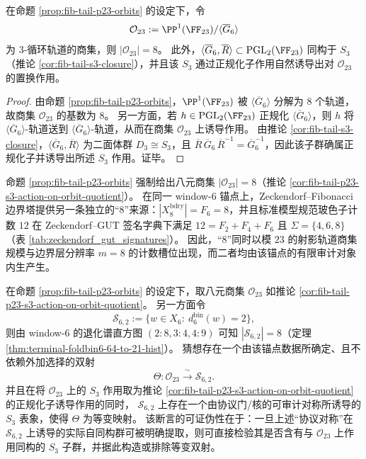 \begin{corollary}\label{cor:fib-tail-p23-s3-action-on-orbit-quotient}
在命题 \ref{prop:fib-tail-p23-orbits} 的设定下，令
\[
\mathcal O_{23}:=\PP^1(\FF_{23})/\langle \overline{G}_6\rangle
\]
为 \(3\)-循环轨道的商集，则 \(|\mathcal O_{23}|=8\)。
此外，\(\langle \overline{G}_6,\overline{R}\rangle\subset \mathrm{PGL}_2(\FF_{23})\) 同构于 \(S_3\)（推论 \ref{cor:fib-tail-s3-closure}），并且该 \(S_3\) 通过正规化子作用自然诱导出对 \(\mathcal O_{23}\) 的置换作用。
\end{corollary}
\begin{proof}
由命题 \ref{prop:fib-tail-p23-orbits}，\(\PP^1(\FF_{23})\) 被 \(\langle \overline{G}_6\rangle\) 分解为 \(8\) 个轨道，故商集 \(\mathcal O_{23}\) 的基数为 \(8\)。
另一方面，若 \(h\in \mathrm{PGL}_2(\FF_{23})\) 正规化 \(\langle \overline{G}_6\rangle\)，则 \(h\) 将 \(\langle \overline{G}_6\rangle\)-轨道送到 \(\langle \overline{G}_6\rangle\)-轨道，从而在商集 \(\mathcal O_{23}\) 上诱导作用。
由推论 \ref{cor:fib-tail-s3-closure}，\(\langle \overline{G}_6,\overline{R}\rangle\) 为二面体群 \(D_3\cong S_3\)，且 \(\overline{R}\,\overline{G}_6\,\overline{R}^{-1}=\overline{G}_6^{-1}\)，因此该子群确属正规化子并诱导出所述 \(S_3\) 作用。证毕。
\end{proof}

\begin{remark}\label{rem:fib-tail-p23-eightfold-alignment}
命题 \ref{prop:fib-tail-p23-orbits} 强制给出八元商集 \(|\mathcal O_{23}|=8\)（推论 \ref{cor:fib-tail-p23-s3-action-on-orbit-quotient}）。
在同一 window-\(6\) 锚点上，Zeckendorf--Fibonacci 边界塔提供另一条独立的“\(8\)”来源：\(|X^{\mathrm{bdry}}_8|=F_6=8\)，并且标准模型规范玻色子计数 \(12\) 在 Zeckendorf--GUT 签名字典下满足 \(12=F_2+F_4+F_6\) 且 \(\Sigma=\{4,6,8\}\)（表 \ref{tab:zeckendorf_gut_signatures}）。
因此，“\(8\)”同时以模 \(23\) 的射影轨道商集规模与边界层分辨率 \(m=8\) 的计数槽位出现，而二者均由该锚点的有限审计对象内生产生。
\end{remark}

\begin{conjecture}[八元商集与二层纤维八重态的可审计对应]\label{conj:window6-eightfold-orbit-fiber-bijection}
在命题 \ref{prop:fib-tail-p23-orbits} 的设定下，取八元商集 \(\mathcal O_{23}\) 如推论 \ref{cor:fib-tail-p23-s3-action-on-orbit-quotient}。
另一方面令
\[
\mathcal S_{6,2}:=\{w\in X_6:\ d^{\mathrm{bin}}_6(w)=2\},
\]
则由 window-\(6\) 的退化谱直方图 \((2{:}8,3{:}4,4{:}9)\) 可知 \(|\mathcal S_{6,2}|=8\)（定理 \ref{thm:terminal-foldbin6-64-to-21-hist}）。
猜想存在一个由该锚点数据所确定、且不依赖外加选择的双射
\[
\Theta:\mathcal O_{23}\xrightarrow{\ \sim\ }\mathcal S_{6,2}.
\]
并且在将 \(\mathcal O_{23}\) 上的 \(S_3\) 作用取为推论 \ref{cor:fib-tail-p23-s3-action-on-orbit-quotient} 的正规化子诱导作用的同时，
\(\mathcal S_{6,2}\) 上存在一个由协议门/核的可审计对称所诱导的 \(S_3\) 表象，使得 \(\Theta\) 为等变映射。
该断言的可证伪性在于：一旦上述“协议对称”在 \(\mathcal S_{6,2}\) 上诱导的实际自同构群可被明确提取，则可直接检验其是否含有与 \(\mathcal O_{23}\) 上作用同构的 \(S_3\) 子群，并据此构造或排除等变双射。
\end{conjecture}

\endinput
